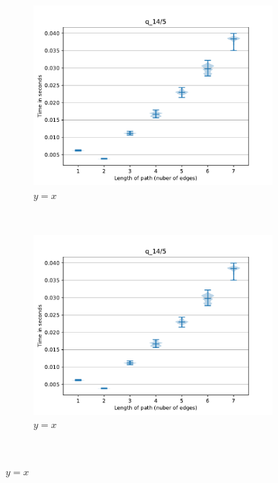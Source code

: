\begin{figure}
     \begin{subfigure}[b]{0.24\textwidth}
         \centering
         \includegraphics[width=\textwidth]{data/res_graphics/q_14_5.pdf}
         \caption{$y=x$}
         \label{fig:y equals x}
     \end{subfigure}
     ~\begin{subfigure}[b]{0.24\textwidth}
         \centering
         \includegraphics[width=\textwidth]{data/res_graphics/q_14_5.pdf}
         \caption{$y=x$}
         \label{fig:y equals x}
     \end{subfigure}\\

\end{figure}
